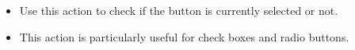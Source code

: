 \begin{itemize}
\item Use this action to check if the button is currently selected or not.
\item This action is particularly useful for check boxes and radio buttons.
\end{itemize}
